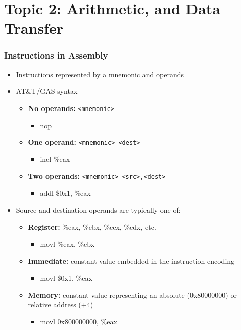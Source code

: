 \documentclass[11pt,xcolor=dvipsnames]{beamer}
\newcommand{\vs}{\vspace{0.5em}}
\begin{document}
\section{Topic 2: Arithmetic, and Data Transfer}

\begin{frame}[fragile,t]
\frametitle{Instructions in Assembly}
\begin{itemize}
    \item Instructions represented by a mnemonic and operands
    \item AT\&T/GAS syntax
    \begin{itemize}
    \item {\bf No operands:} \verb+<mnemonic>+
    \begin{itemize}
        \item {\ttfamily nop}
    \end{itemize}
    \item {\bf One operand:} \verb+<mnemonic> <dest>+
    \begin{itemize}
        \item {\ttfamily incl \%eax}
    \end{itemize}
    \item {\bf Two operands:} \verb+<mnemonic> <src>,<dest>+
    \begin{itemize}
        \item {\ttfamily addl \$0x1, \%eax}
    \end{itemize}
    \end{itemize}
    \vs
    \pause
    \item Source and destination operands are typically one of:
    \begin{itemize}
        \item {\bf Register:} {\ttfamily \%eax, \%ebx, \%ecx, \%edx,} etc.
        \begin{itemize}
            \item {\ttfamily movl \%eax, \%ebx}
        \end{itemize}
        \item {\bf Immediate:} constant value embedded in the instruction encoding
        \begin{itemize}
            \item {\ttfamily movl \$0x1, \%eax}
        \end{itemize}
        \item {\bf Memory:} constant value representing an absolute (0x80000000) or relative address (+4)
        \begin{itemize}
            \item {\ttfamily movl 0x800000000, \%eax}
        \end{itemize}
    \end{itemize}
\end{itemize}
\end{frame}
\end{document}
